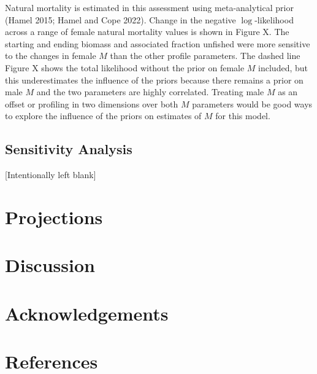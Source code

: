 \documentclass[
]{scrartcl}
\begin{document}
Natural mortality is estimated in this assessment using meta-analytical
prior (Hamel 2015; Hamel and Cope 2022). Change in the negative
$\log$-likelihood across a range of female natural mortality values is
shown in Figure X. The starting and ending biomass and associated
fraction unfished were more sensitive to the changes in female \(M\)
than the other profile parameters. The dashed line Figure X shows the
total likelihood without the prior on female \(M\) included, but this
underestimates the influence of the priors because there remains a prior
on male \(M\) and the two parameters are highly correlated. Treating
male \(M\) as an offset or profiling in two dimensions over both \(M\)
parameters would be good ways to explore the influence of the priors on
estimates of \(M\) for this model.

\subsection{Sensitivity Analysis}\label{sensitivity-analysis}

{[}Intentionally left blank{]}

\newpage{}

\section{Projections}\label{projections}

\newpage{}

\section{Discussion}\label{discussion}

\newpage{}

\section{Acknowledgements}\label{acknowledgements}

\newpage{}

\section{References}\label{references}
\end{document}
